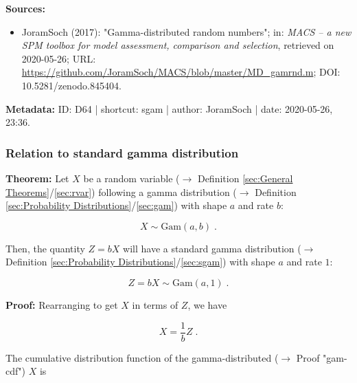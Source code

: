\documentclass[a4paper,12pt,twoside]{book}
\begin{document}
\vspace{1em}
\textbf{Sources:}
\begin{itemize}
\item JoramSoch (2017): "Gamma-distributed random numbers"; in: \textit{MACS – a new SPM toolbox for model assessment, comparison and selection}, retrieved on 2020-05-26; URL: \url{https://github.com/JoramSoch/MACS/blob/master/MD_gamrnd.m}; DOI: 10.5281/zenodo.845404.
\end{itemize}


\vspace{1em}
\textbf{Metadata:} ID: D64 | shortcut: sgam | author: JoramSoch | date: 2020-05-26, 23:36.
\vspace{1em}



\subsubsection[\textbf{Relation to standard gamma distribution}]{Relation to standard gamma distribution} \label{sec:gam-sgam}
\setcounter{equation}{0}

\textbf{Theorem:} Let $X$ be a random variable ($\rightarrow$ Definition \ref{sec:General Theorems}/\ref{sec:rvar}) following a gamma distribution ($\rightarrow$ Definition \ref{sec:Probability Distributions}/\ref{sec:gam}) with shape $a$ and rate $b$:

\begin{equation} \label{eq:gam-sgam-X-gam}
X \sim \mathrm{Gam}(a,b) \; .
\end{equation}

Then, the quantity $Z = b X$ will have a standard gamma distribution ($\rightarrow$ Definition \ref{sec:Probability Distributions}/\ref{sec:sgam}) with shape $a$ and rate $1$:

\begin{equation} \label{eq:gam-sgam-Z-snorm}
Z = b X \sim \mathrm{Gam}(a,1) \; .
\end{equation}


\vspace{1em}
\textbf{Proof:} Rearranging to get $X$ in terms of $Z$, we have

\begin{equation} \label{eq:gam-sgam-X-Z}
X = \frac{1}{b} Z \; .
\end{equation}

The cumulative distribution function of the gamma-distributed ($\rightarrow$ Proof "gam-cdf") $X$ is
\end{document}
